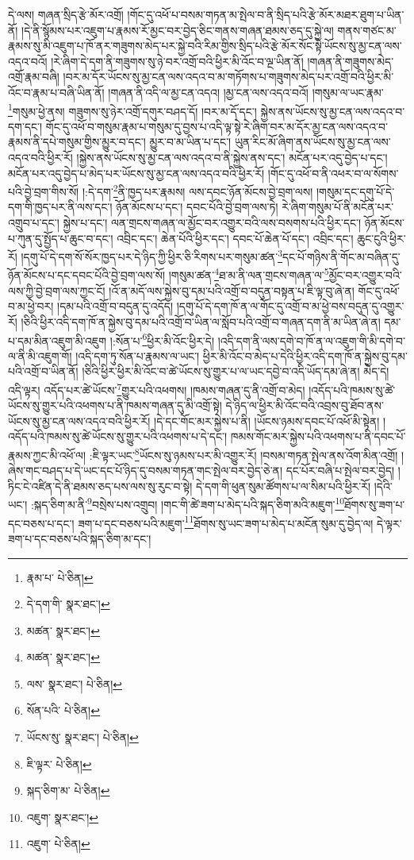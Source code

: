 དེ་ལས། གཞན་སྲིད་རྩེ་མོར་འགྲོ། །གོང་དུ་འཕོ་པ་བསམ་གཏན་མ་སྤེལ་བ་ནི་སྲིད་པའི་རྩེ་མོར་མཐར་ཐུག་པ་ཡིན་ནོ། །དེ་ནི་སྙོམས་པར་འཇུག་པ་རྣམས་རོ་མྱང་བར་བྱེད་ཅིང་གནས་གཞན་ཐམས་ཅད་དུ་སྐྱེ་ལ། གནས་གཙང་མ་རྣམས་སུ་མི་འཇུག་པ་ཁོ་ནར་གཟུགས་མེད་པར་སྐྱེ་བའི་རིམ་གྱིས་སྲིད་པའི་རྩེ་མོར་སོང་སྟེ་ཡོངས་སུ་མྱ་ངན་ལས་འདའ་བའོ། །རེ་ཞིག་དེ་དག་ནི་གཟུགས་སུ་ཉེ་བར་འགྲོ་བའི་ཕྱིར་མི་འོང་བ་ལྔ་ཡིན་ནོ། །གཞན་ནི་གཟུགས་མེད་འགྲོ་རྣམ་བཞི། །བར་མ་དོར་ཡོངས་སུ་མྱ་ངན་ལས་འདའ་བ་མ་གཏོགས་པ་གཟུགས་མེད་པར་འགྲོ་བའི་ཕྱིར་མི་འོང་བ་རྣམ་པ་བཞི་ཡིན་ནོ། །གཞན་ནི་འདི་ལ་མྱ་ངན་འདའ། །མྱ་ངན་ལས་འདའ་བའོ། །གསུམ་ལ་ཡང་རྣམ་\footnote{རྣམ་པ་  པེ་ཅིན། }གསུམ་ཕྱེ་ནས། གཟུགས་སུ་ཉེར་འགྲོ་དགུར་བཤད་དོ། །བར་མ་དོ་དང་། སྐྱེས་ནས་ཡོངས་སུ་མྱ་ངན་ལས་འདའ་བ་དག་དང་། གོང་དུ་འཕོ་བ་གསུམ་རྣམ་པ་གསུམ་དུ་བྱས་པ་འདི་ལྟ་སྟེ་རེ་ཞིག་བར་མ་དོར་མྱ་ངན་ལས་འདའ་བ་རྣམས་ནི་དཔེ་གསུམ་གྱིས་མྱུར་བ་དང་། མྱུར་བ་མ་ཡིན་པ་དང་། ཡུན་རིང་མོ་ཞིག་ནས་ཡོངས་སུ་མྱ་ངན་ལས་འདའ་བའི་ཕྱིར་རོ། །སྐྱེས་ནས་ཡོངས་སུ་མྱ་ངན་ལས་འདའ་བ་ནི་སྐྱེས་ནས་དང་། མངོན་པར་འདུ་བྱེད་པ་དང་། མངོན་པར་འདུ་བྱེད་པ་མེད་པར་ཡོངས་སུ་མྱ་ངན་ལས་འདའ་བའི་ཕྱིར་རོ། །གོང་དུ་འཕོ་བ་ནི་འཕར་བ་ལ་སོགས་པའི་བྱེ་བྲག་གིས་སོ། །:དེ་དག་\footnote{དེ་དག་གི་  སྣར་ཐང་། }ནི་ཁྱད་པར་རྣམས། ལས་དབང་ཉོན་མོངས་བྱེ་བྲག་ལས། །གསུམ་དང་དགུ་པོ་དེ་དག་གི་ཁྱད་པར་ནི་ལས་དང་། ཉོན་མོངས་པ་དང་། དབང་པོའི་བྱེ་བྲག་ལས་ཏེ། རེ་ཞིག་གསུམ་པོ་ནི་མངོན་པར་འགྲུབ་པ་དང་། སྐྱེས་པ་དང་། ལན་གྲངས་གཞན་ལ་མྱོང་བར་འགྱུར་བའི་ལས་བསགས་པའི་ཕྱིར་དང་། ཉོན་མོངས་པ་ཀུན་དུ་སྤྱོད་པ་ཆུང་བ་དང་། འབྲིང་དང་། ཆེན་པོའི་ཕྱིར་དང་། དབང་པོ་ཆེན་པོ་དང་། འབྲིང་དང་། ཆུང་ངུའི་ཕྱིར་རོ། །དགུ་པོ་དེ་དག་སོ་སོར་ཁྱད་པར་དེ་ཉིད་ཀྱི་ཕྱིར་ཅི་རིགས་པར་གསུམ་ཚན་\footnote{མཚན་  སྣར་ཐང་། }དང་པོ་གཉིས་ནི་གོང་མ་བཞིན་དུ་ཉོན་མོངས་པ་དང་དབང་པོའི་བྱེ་བྲག་ལས་སོ། །གསུམ་ཚན་\footnote{མཚན་  སྣར་ཐང་། }ཐ་མ་ནི་ལན་གྲངས་གཞན་ལ་\footnote{ལས་  སྣར་ཐང་།  པེ་ཅིན། }མྱོང་བར་འགྱུར་བའི་ལས་ཀྱི་བྱེ་བྲག་ལས་ཀྱང་ངོ། །འོ་ན་མདོ་ལས་སྐྱེས་བུ་དམ་པའི་འགྲོ་བ་བདུན་བསྟན་པ་ཇི་ལྟ་བུ་ཞེ་ན། གོང་དུ་འཕོ་བ་མ་ཕྱེ་བར། །དམ་པའི་འགྲོ་བ་བདུན་དུ་འདོད། །དགུ་པོ་དེ་དག་ཁོ་ན་ལ་གོང་དུ་འགྲོ་བ་མ་ཕྱེ་བས་བདུན་དུ་འགྱུར་རོ། །ཅིའི་ཕྱིར་འདི་དག་ཁོ་ན་སྐྱེས་བུ་དམ་པའི་འགྲོ་བ་ཡིན་ལ་སློབ་པའི་འགྲོ་བ་གཞན་དག་ནི་མ་ཡིན་ཞེ་ན། དམ་པ་དམ་མིན་འཇུག་མི་འཇུག །:སོན་པ་\footnote{སོན་པའི་  པེ་ཅིན། }ཕྱིར་མི་འོང་ཕྱིར་དེ། །འདི་དག་ནི་ལས་དགེ་བ་ཁོ་ན་ལ་འཇུག་གི་མི་དགེ་བ་ལ་ནི་མི་འཇུག་གོ། །འདི་དག་ཏུ་སོན་པ་རྣམས་ལ་ཡང་། ཕྱིར་མི་འོང་བ་མེད་པ་དེའི་ཕྱིར་འདི་དག་ཁོ་ན་སྐྱེས་བུ་དམ་པའི་འགྲོ་བ་ཡིན་ནོ། །ཅིའི་ཕྱིར་ཕྱིར་མི་འོང་བ་ཚེ་ཡོངས་སུ་གྱུར་པ་ལ་ཡང་དབྱེ་བ་འདི་ཡོད་དམ་ཞེ་ན། མེད་དེ། འདི་ལྟར། འདོད་པར་ཚེ་ཡོངས་\footnote{ཡོངས་སུ་  སྣར་ཐང་།  པེ་ཅིན། }གྱུར་པའི་འཕགས། །ཁམས་གཞན་དུ་ནི་འགྲོ་བ་མེད། །འདོད་པའི་ཁམས་སུ་ཚེ་ཡོངས་སུ་གྱུར་པའི་འཕགས་པ་ནི་ཁམས་གཞན་དུ་མི་འགྲོ་སྟེ། དེ་ཉིད་ལ་ཕྱིར་མི་འོང་བའི་འབྲས་བུ་ཐོབ་ནས་ཡོངས་སུ་མྱ་ངན་ལས་འདའ་བའི་ཕྱིར་རོ། །དེ་དང་གོང་མར་སྐྱེས་པ་ནི། །ཡོངས་ཉམས་དབང་པོ་འཕོ་མི་སྟེན། །འདོད་པའི་ཁམས་སུ་ཚེ་ཡོངས་སུ་གྱུར་པའི་འཕགས་པ་དེ་དང་། ཁམས་གོང་མར་སྐྱེས་པའི་འཕགས་པ་ནི་དབང་པོ་རྣམས་ཀྱང་མི་འཕོ་ལ། :ཇི་ལྟར་ཡང་\footnote{ཇི་ལྟར་  པེ་ཅིན། }ཡོངས་སུ་ཉམས་པར་མི་འགྱུར་རོ། །བསམ་གཏན་སྤེལ་ནས་འོག་མིན་འགྲོ། །ཞེས་གང་བཤད་པ་དེ་ཡང་དང་པོ་ཉིད་དུ་བསམ་གཏན་གང་སྤེལ་བར་བྱེད་ཅེ་ན། དང་པོར་བཞི་པ་སྤེལ་བར་བྱེད། །ཏིང་ངེ་འཛིན་དེ་ནི་ཐམས་ཅད་པས་ལས་སུ་རུང་བ་སྟེ། དེ་དག་གི་ཕུན་སུམ་ཚོགས་པ་ལ་སིམ་པའི་ཕྱིར་རོ། །དེའི་ཡང་། :སྐད་ཅིག་མ་ནི་\footnote{སྐད་ཅིག་མ་  པེ་ཅིན། }བསྲེས་པས་འགྲུབ། །གང་གི་ཚེ་ཟག་པ་མེད་པའི་སྐད་ཅིག་མའི་མཇུག་\footnote{འཇུག་  སྣར་ཐང་། }ཐོགས་སུ་ཟག་པ་དང་བཅས་པ་དང་། ཟག་པ་དང་བཅས་པའི་མཇུག་\footnote{འཇུག་  པེ་ཅིན། }ཐོགས་སུ་ཡང་ཟག་པ་མེད་པ་མངོན་སུམ་དུ་བྱེད་ལ། དེ་ལྟར་ཟག་པ་དང་བཅས་པའི་སྐད་ཅིག་མ་དང་། 